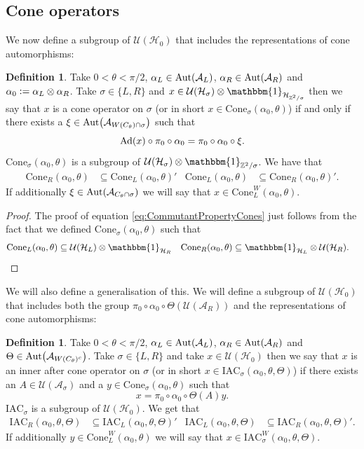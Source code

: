 \documentclass[12pt,a4paper,twoside]{article}
\newcommand{\IAC}{\textrm{IAC}}
\newcommand{\defeq}{\vcentcolon=}
\let\originalleft\left
\let\originalright\right
\renewcommand{\left}{\mathopen{}\mathclose\bgroup\originalleft}
\renewcommand{\right}{\aftergroup\egroup\originalright}
\newcommand{\UU}{\mathcal U}
\newcommand{\HH}{\mathcal H}
\newcommand{\ZZ}{\mathbb Z}
\renewcommand{\AA}{\mathcal A}
\newcommand{\id}{\mathbbm{1}}
\newcommand{\Ad}[1]{\textrm{Ad}\left(#1\right)}
\newcommand{\Aut}[1]{\textrm{Aut}\left(#1\right)}
\theoremstyle{definition}
\newtheorem{definition}[theorem]{Definition}
\numberwithin{equation}{section}
\begin{document}
\subsection{Cone operators}
 We now define a subgroup of $\UU(\HH_0)$ that includes the representations of cone automorphisms:
\begin{definition}\label{def:ConeOperators}
	Take $0<\theta<\pi/2$, $\alpha_L\in\Aut{\AA_{L}}$, $\alpha_R\in\Aut{\AA_{R}}$ and $\alpha_0\defeq \alpha_L\otimes\alpha_R$. Take $\sigma\in\{L,R\}$ and $x\in\UU(\HH_{\sigma})\otimes\id_{\HH_{\ZZ^2/\sigma}}$ then we say that $x$ is a cone operator on $\sigma$ (or in short $x\in\textrm{Cone}_{\sigma}(\alpha_0,\theta)$) if and only if there exists a $\xi\in\Aut{\AA_{W(C_\theta)\cap\sigma}}$ such that
	\begin{equation}
		\Ad{x}\circ\pi_0\circ\alpha_0=\pi_0\circ\alpha_0\circ\xi.
	\end{equation}
	$\textrm{Cone}_\sigma(\alpha_0,\theta)$ is a subgroup of $\UU(\HH_\sigma)\otimes\id_{\ZZ^2/\sigma}$. We have that
	\begin{align}\label{eq:CommutantPropertyCones}
		\textrm{Cone}_R(\alpha_0,\theta)&\subseteq\textrm{Cone}_L(\alpha_0,\theta)'&\textrm{Cone}_L(\alpha_0,\theta)&\subseteq\textrm{Cone}_R(\alpha_0,\theta)'.
	\end{align}
	If additionally $\xi\in\Aut{\AA_{C_\theta\cap\sigma}}$ we will say that $x\in\textrm{Cone}_L^W(\alpha_0,\theta)$.
\end{definition}
\begin{proof}
	The proof of equation \eqref{eq:CommutantPropertyCones} just follows from the fact that we defined $\textrm{Cone}_\sigma(\alpha_0,\theta)$ such that
	\begin{align}
		\textrm{Cone}_L(\alpha_0,\theta)&\subseteq \UU(\HH_L)\otimes\id_{\HH_R}&\textrm{Cone}_R(\alpha_0,\theta)&\subseteq \id_{\HH_L} \otimes \UU(\HH_R).
	\end{align}
\end{proof}
We will also define a generalisation of this. We will define a subgroup of $\UU(\HH_0)$ that includes both the group $\pi_0\circ\alpha_0\circ\Theta(\UU(\AA_R))$ and the representations of cone automorphisms:
\begin{definition}
	Take $0<\theta<\pi/2$, $\alpha_L\in\Aut{\AA_{L}}$, $\alpha_R\in\Aut{\AA_{R}}$ and $\Theta\in\Aut{\AA_{W(C_\theta)^c}}$. Take $\sigma\in\{L,R\}$ and take $x\in\UU(\HH_0)$ then we say that $x$ is an inner after cone operator on $\sigma$ (or in short $x\in \IAC_\sigma(\alpha_0,\theta,\Theta)$) if there exists an $A\in\UU(\AA_\sigma)$ and a $y\in\textrm{Cone}_\sigma(\alpha_0,\theta)$ such that
	\begin{equation}
		x=\pi_0\circ\alpha_0\circ\Theta(A)y.
	\end{equation}
	$\IAC_\sigma$ is a subgroup of $\UU(\HH_0)$. We get that
	\begin{align}\label{eq:CommutantProperty}
		\IAC_R(\alpha_0,\theta,\Theta)&\subseteq\IAC_L(\alpha_0,\theta,\Theta)'&\IAC_L(\alpha_0,\theta,\Theta)&\subseteq\IAC_R(\alpha_0,\theta,\Theta)'.
	\end{align}
	If additionally $y\in \textrm{Cone}_L^W(\alpha_0,\theta)$ we will say that $x\in \IAC_\sigma^W(\alpha_0,\theta,\Theta)$.
\end{definition}
\end{document}
